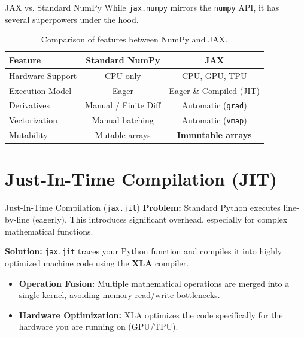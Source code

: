 \documentclass[aspectratio=169]{beamer}
\begin{document}
\begin{frame}{JAX vs. Standard NumPy}
    While \texttt{jax.numpy} mirrors the \texttt{numpy} API, it has several superpowers under the hood.

    \vspace{0.5cm}
    \begin{table}[]
        \centering
        \begin{tabular}{@{} l cc @{}}
            \toprule
            \textbf{Feature} & \textbf{Standard NumPy} & \textbf{JAX}              \\
            \midrule
            Hardware Support & CPU only                & CPU, GPU, TPU             \\
            Execution Model  & Eager                   & Eager \& Compiled (JIT)   \\
            Derivatives      & Manual / Finite Diff    & Automatic (\texttt{grad}) \\
            Vectorization    & Manual batching         & Automatic (\texttt{vmap}) \\
            Mutability       & Mutable arrays          & \textbf{Immutable arrays} \\
            \bottomrule
        \end{tabular}
        \caption{Comparison of features between NumPy and JAX.}
    \end{table}
\end{frame}

\section{Just-In-Time Compilation (JIT)}

\begin{frame}{Just-In-Time Compilation (\texttt{jax.jit})}
    \textbf{Problem:} Standard Python executes line-by-line (eagerly). This introduces significant overhead, especially for complex mathematical functions.

    \vspace{0.3cm}
    \textbf{Solution:} \texttt{jax.jit} traces your Python function and compiles it into highly optimized machine code using the \textbf{XLA} compiler.

    \vspace{0.3cm}
    \begin{itemize}
        \item \textbf{Operation Fusion:} Multiple mathematical operations are merged into a single kernel, avoiding memory read/write bottlenecks.
        \item \textbf{Hardware Optimization:} XLA optimizes the code specifically for the hardware you are running on (GPU/TPU).
    \end{itemize}
\end{frame}
\end{document}
